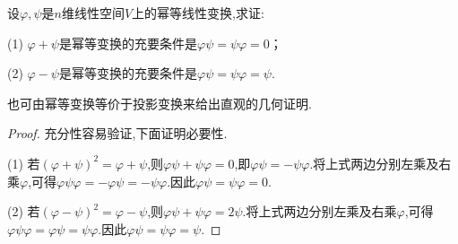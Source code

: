 \documentclass[../../main.tex]{subfiles}%
\begin{document}
\begin{proposition}\label{proposition:幂等变换的和与差仍是幂等变换的充要条件1}
设\(\varphi,\psi\)是\(n\)维线性空间\(V\)上的幂等线性变换,求证:

(1) \(\varphi+\psi\)是幂等变换的充要条件是\(\varphi\psi=\psi\varphi = 0\)；

(2) \(\varphi-\psi\)是幂等变换的充要条件是\(\varphi\psi=\psi\varphi=\psi\).
\end{proposition}
\begin{note}
也可由幂等变换等价于投影变换来给出直观的几何证明.
\end{note}
\begin{proof}
充分性容易验证,下面证明必要性.

(1) 若\((\varphi+\psi)^2=\varphi+\psi\),则\(\varphi\psi+\psi\varphi = 0\),即\(\varphi\psi=-\psi\varphi\).将上式两边分别左乘及右乘\(\varphi\),可得\(\varphi\psi\varphi=-\varphi\psi=-\psi\varphi\).因此\(\varphi\psi=\psi\varphi = 0\).

(2) 若\((\varphi - \psi)^2=\varphi - \psi\),则\(\varphi\psi+\psi\varphi = 2\psi\).将上式两边分别左乘及右乘\(\varphi\),可得\(\varphi\psi\varphi=\varphi\psi=\psi\varphi\).因此\(\varphi\psi=\psi\varphi=\psi\).
\end{proof}
\end{document}
